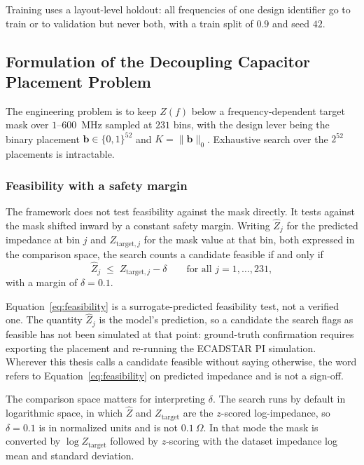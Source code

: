 Training uses a layout-level holdout: all frequencies of one design identifier go
to train or to validation but never both, with a train split of $0.9$ and seed
$42$. 

\subsection{Formulation of the Decoupling Capacitor Placement Problem}
\label{subsec:decap_placement_formulation}

The engineering problem is to keep $Z(f)$ below a frequency-dependent target mask
over $1$--$600$~MHz sampled at $231$ bins, with the design lever being the binary
placement $\mathbf{b} \in \{0,1\}^{52}$ and $K = \lVert \mathbf{b} \rVert_0$.
Exhaustive search over the $2^{52}$ placements is intractable.

\subsubsection*{Feasibility with a safety margin}

The framework does not test feasibility against the mask directly. It tests
against the mask shifted inward by a constant safety margin. Writing
$\hat{Z}_j$ for the predicted impedance at bin $j$ and $Z_{\mathrm{target},j}$
for the mask value at that bin, both expressed in the comparison space, the
search counts a candidate feasible if and only if
\begin{equation}
\hat{Z}_j \;\le\; Z_{\mathrm{target},j} - \delta
\qquad \text{for all } j = 1,\dots,231,
\label{eq:feasibility}
\end{equation}
with a margin of $\delta = 0.1$.

Equation~\ref{eq:feasibility} is a surrogate-predicted feasibility test, not a
verified one. The quantity $\hat{Z}_j$ is the model's prediction, so a candidate
the search flags as feasible has not been simulated at that point: ground-truth
confirmation requires exporting the placement and re-running the ECADSTAR PI
simulation. Wherever this thesis calls a candidate feasible without saying
otherwise, the word refers to Equation~\ref{eq:feasibility} on predicted
impedance and is not a sign-off.

The comparison space matters for interpreting $\delta$. The search runs by
default in logarithmic space, in which $\hat{Z}$ and $Z_{\mathrm{target}}$ are
the $z$-scored log-impedance, so $\delta = 0.1$ is in normalized units and is not
$0.1~\Omega$. In that mode the mask is converted by $\log Z_{\mathrm{target}}$
followed by $z$-scoring with the dataset impedance log mean and standard
deviation.


